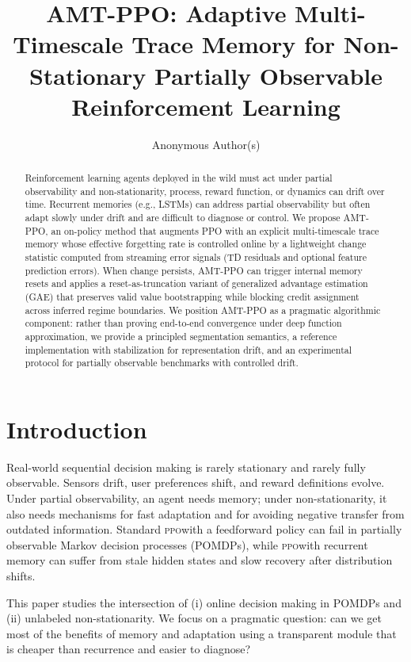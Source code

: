 \documentclass{article}
\title{AMT-PPO: Adaptive Multi-Timescale Trace Memory for Non-Stationary Partially Observable Reinforcement Learning}
\author{Anonymous Author(s)}
\newcommand{\PPO}{\textsc{ppo}}
\begin{document}
\maketitle

\begin{abstract}
Reinforcement learning agents deployed in the wild must act under partial observability and non-stationarity, process, reward function, or dynamics can drift over time. Recurrent memories (e.g., LSTMs) can address partial observability but often adapt slowly under drift and are difficult to diagnose or control.
We propose AMT-PPO, an on-policy method that augments PPO with an explicit multi-timescale trace memory whose effective forgetting rate is controlled online by a lightweight change statistic computed from streaming error signals (TD residuals and optional feature prediction errors). When change persists, AMT-PPO can trigger internal memory resets and applies a reset-as-truncation variant of generalized advantage estimation (GAE) that preserves valid value bootstrapping while blocking credit assignment across inferred regime boundaries.
We position AMT-PPO as a pragmatic algorithmic component: rather than proving end-to-end convergence under deep function approximation, we provide a principled segmentation semantics, a reference implementation with stabilization for representation drift, and an experimental protocol for partially observable benchmarks with controlled drift.
\end{abstract}


\section{Introduction}
Real-world sequential decision making is rarely stationary and rarely fully observable. Sensors drift, user preferences shift, and reward definitions evolve. Under partial observability, an agent needs memory; under non-stationarity, it also needs mechanisms for fast adaptation and for avoiding negative transfer from outdated information. Standard \PPO with a feedforward policy can fail in partially observable Markov decision processes (POMDPs), while \PPO with recurrent memory can suffer from stale hidden states and slow recovery after distribution shifts.

This paper studies the intersection of (i) online decision making in POMDPs and (ii) unlabeled non-stationarity. We focus on a pragmatic question: can we get most of the benefits of memory and adaptation using a transparent module that is cheaper than recurrence and easier to diagnose?
\end{document}
